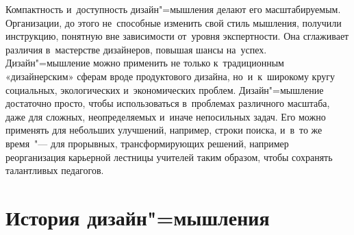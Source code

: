 \documentclass[12pt]{article}
\begin{document}
Компактность и~доступность дизайн"=мышления делают его масштабируемым. Организации, до этого не~способные изменить свой стиль мышления, получили инструкцию, понятную вне зависимости от~уровня экспертности. Она сглаживает различия в~мастерстве дизайнеров, повышая шансы на~успех. Дизайн"=мышление можно применить не только к~традиционным «дизайнерским» сферам вроде продуктового дизайна, но~и~к~широкому кругу социальных, экологических и~экономических проблем. Дизайн"=мышление достаточно просто, чтобы использоваться в~проблемах различного масштаба, даже для сложных, неопределяемых и~иначе непосильных задач. Его можно применять для небольших улучшений, например, строки поиска, и~в~то же время~"--- для прорывных, трансформирующих решений, например реорганизация карьерной лестницы учителей таким образом, чтобы сохранять талантливых педагогов.

\section{История дизайн"=мышления}

\end{document}
